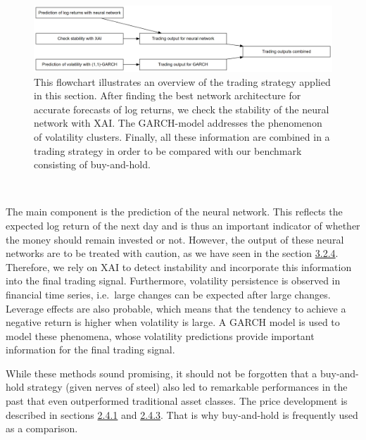 \documentclass[
]{article}
\begin{document}
~

\begin{figure}

{\centering \includegraphics[width=1\linewidth]{images/flowchart_trading} 

}

\caption{This flowchart illustrates an overview of the trading strategy applied in this section. After finding the best network architecture for accurate forecasts of log returns, we check the stability of the neural network with XAI. The GARCH-model addresses the phenomenon of volatility clusters. Finally, all these information are combined in a trading strategy in order to be compared with our benchmark consisting of buy-and-hold.}\label{fig:flowchart_trading}
\end{figure}

~

The main component is the prediction of the neural network. This
reflects the expected log return of the next day and is thus an
important indicator of whether the money should remain invested or not.
However, the output of these neural networks are to be treated with
caution, as we have seen in the section
\protect\hyperlink{evaluate_nn}{3.2.4}. Therefore, we rely on XAI to
detect instability and incorporate this information into the final
trading signal. Furthermore, volatility persistence is observed in
financial time series, i.e.~large changes can be expected after large
changes. Leverage effects are also probable, which means that the
tendency to achieve a negative return is higher when volatility is
large. A GARCH model is used to model these phenomena, whose volatility
predictions provide important information for the final trading signal.

While these methods sound promising, it should not be forgotten that a
buy-and-hold strategy (given nerves of steel) also led to remarkable
performances in the past that even outperformed traditional asset
classes. The price development is described in sections
\protect\hyperlink{historical_analysis}{2.4.1} and
\protect\hyperlink{bitcoin_valuation}{2.4.3}. That is why buy-and-hold
is frequently used as a comparison.
\end{document}
